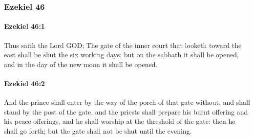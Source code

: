 	\subsubsection{Ezekiel 46} %
		\label{EZEKIEL-46}

		\paragraph{Ezekiel 46:1} %
			\label{EZEKIEL-46-1}

			Thus saith the Lord GOD; The gate of the inner court that looketh toward the east shall be shut the six working days; but on the sabbath it shall be opened, and in the day of the new moon it shall be opened.


		\paragraph{Ezekiel 46:2} %
			\label{EZEKIEL-46-2}

			And the prince shall enter by the way of the porch of that gate without, and shall stand by the post of the gate, and the priests shall prepare his burnt offering and his peace offerings, and he shall worship at the threshold of the gate: then he shall go forth; but the gate shall not be shut until the evening.

